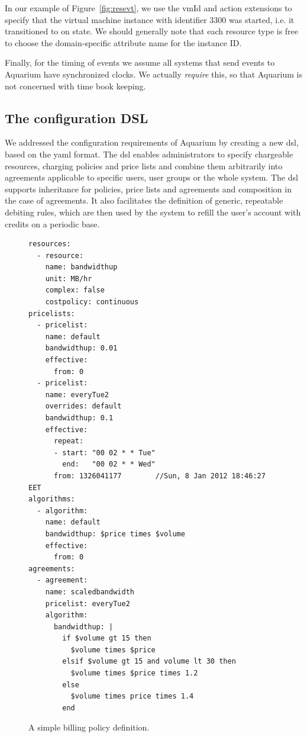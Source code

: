 \documentclass[preprint,10pt]{sigplanconf}
\begin{document}
In our example of Figure~\ref{fig:resevt}, we use the \textsf{vmId} and \textsf{action} extensions to specify that the virtual machine instance with identifier \textsf{3300} was started, i.e. it transitioned to \textsf{on} state. We should generally note that each resource type is free to choose the domain-specific attribute name for the instance \textsf{ID}. 

Finally, for the timing of events we assume all systems that send events to Aquarium have synchronized clocks. We actually \textit{require} this, so that Aquarium is not concerned with time book keeping.


\subsection{The configuration DSL}
\label{sec:dsl}

We addressed the configuration requirements of Aquarium by creating a new {\sc
dsl}, based on the {\sc yaml} format.  The {\sc dsl} enables administrators to
specify chargeable resources, charging policies and price lists and combine
them arbitrarily into agreements applicable to specific users, user groups or
the whole system. The {\sc dsl} supports inheritance for policies, price lists
and agreements and composition in the case of agreements.  It also facilitates
the definition of generic, repeatable debiting rules, which are then used by
the system to refill the user's account with credits on a periodic base.

\begin{figure}
\lstset{language=c, basicstyle=\footnotesize,
stringstyle=\ttfamily, 
flexiblecolumns=true, aboveskip=-0.9em, belowskip=0em, lineskip=0em}

\begin{lstlisting}
resources:
  - resource:
    name: bandwidthup
    unit: MB/hr
    complex: false
    costpolicy: continuous
pricelists:
  - pricelist: 
    name: default
    bandwidthup: 0.01
    effective:
      from: 0
  - pricelist: 
    name: everyTue2
    overrides: default
    bandwidthup: 0.1
    effective:
      repeat:
      - start: "00 02 * * Tue"
        end:   "00 02 * * Wed"
      from: 1326041177        //Sun, 8 Jan 2012 18:46:27 EET
algorithms:
  - algorithm:
    name: default
    bandwidthup: $price times $volume
    effective:
      from: 0
agreements:
  - agreement:
    name: scaledbandwidth
    pricelist: everyTue2
    algorithm:
      bandwidthup: |
        if $volume gt 15 then
          $volume times $price
        elsif $volume gt 15 and volume lt 30 then
          $volume times $price times 1.2
        else
          $volume times price times 1.4
        end
\end{lstlisting}

\caption{A simple billing policy definition.} 
\label{fig:dsl}
\end{figure}
\end{document}
